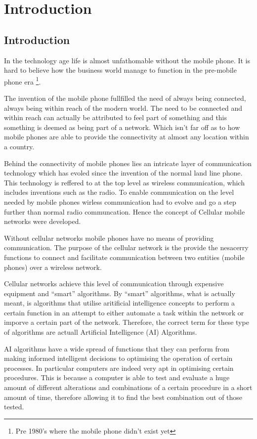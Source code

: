 \chapter{Introduction}
\section{Introduction}
In the technology age life is almost unfathomable without the mobile phone. It is hard to believe how the business world manage to function in the pre-mobile phone era \footnote{Pre 1980's where the mobile phone didn't exist yet}. 

The invention of the mobile phone fullfilled the need of always being connected, always being within reach of the modern world. The need to be connected and within reach can actually be attributed to feel part of something and this something is deemed as being part of a network. Which isn't far off as to how mobile phones are able to provide the connectivity at almost any location within a country.

Behind the connectivity of mobile phones lies an intricate layer of communication technology which has evoled since the invention of the normal land line phone. This technology is reffered to at the top level as wireless communication, which includes inventions such as the radio. To enable communication on the level needed by mobile phones wirless communication had to evolve and go a step further than normal radio communcation. Hence the concept of Cellular mobile networks were developed.

Without cellular networks mobile phones have no means of providing communication. The purpose of the cellular network is the provide the nesacerry functions to connect and facilitate communication between two entities (mobile phones) over a wireless network. 

Cellular networks achieve this level of communication through expensive equipment and ``smart'' algorithms. By ``smart'' algorithms, what is actually meant, is algorithms that utilise aritificial intelligence concepts to perform a certain function in an attempt to either automate a task within the network or imporve a certain part of the network. Therefore, the correct term for these type of algorithms are actuall Artificial Intelligence (AI) Algorithms.

AI algorithms have a wide spread of functions that they can perform from making informed intelligent decisions to optimising the operation of certain processes. In particular computers are indeed very apt in optimising certain procedures. This is because a computer is able to test and evaluate a huge amount of different alterations and combinations of a certain procedure in a short amount of time, therefore allowing it to find the best combination out of those tested.

